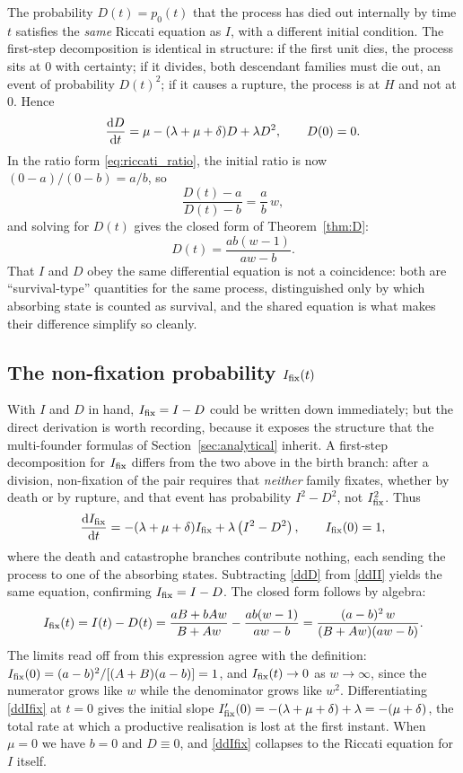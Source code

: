The probability $D(t)=p_0(t)$ that the process has died out internally by time
$t$ satisfies the \textit{same} Riccati equation as $I$, with a different
initial condition. The first-step decomposition is identical in structure: if
the first unit dies, the process sits at $0$ with certainty; if it divides,
both descendant families must die out, an event of probability $D(t)^2$; if it
causes a rupture, the process is at $H$ and not at $0$. Hence
\begin{equation}
\label{ddD}
\displaystyle\frac{{\rm d} D}{{\rm d} t} = \mu - (\lambda + \mu + \delta) D + \lambda D^2,\qquad D(0)=0.
\end{equation}
In the ratio form \eqref{eq:riccati_ratio}, the initial ratio is now
$(0-a)/(0-b)=a/b$, so
$$\frac{D(t)-a}{D(t)-b} = \frac{a}{b}\,w,$$
and solving for $D(t)$ gives the closed form of Theorem~\ref{thm:D}:
$$D(t) = \frac{ab(w-1)}{aw-b}.$$
That $I$ and $D$ obey the same differential equation is not a coincidence: both
are ``survival-type'' quantities for the same process, distinguished only by
which absorbing state is counted as survival, and the shared equation is what
makes their difference simplify so cleanly.

\subsection{The non-fixation probability $I_{\mathrm{fix}}(t)$}

With $I$ and $D$ in hand, $I_{\mathrm{fix}}=I-D$ could be written down immediately; but the
direct derivation is worth recording, because it exposes the structure that the
multi-founder formulas of Section~\ref{sec:analytical} inherit. A first-step
decomposition for $I_{\mathrm{fix}}$ differs from the two above in the birth branch: after
a division, non-fixation of the pair requires that \textit{neither} family
fixates, whether by death or by rupture, and that event has probability
$I^2-D^2$, not $I_{\mathrm{fix}}^2$. Thus
\begin{equation}
\label{ddIfix}
\displaystyle\frac{{\rm d} I_{\mathrm{fix}}}{{\rm d} t} = -(\lambda + \mu + \delta)I_{\mathrm{fix}} + \lambda\left( I^2 - D^2\right),\qquad I_{\mathrm{fix}}(0)=1,
\end{equation}
where the death and catastrophe branches contribute nothing, each sending the
process to one of the absorbing states. Subtracting \eqref{ddD} from
\eqref{ddII} yields the same equation, confirming $I_{\mathrm{fix}} = I - D$. The closed
form follows by algebra:
$$I_{\mathrm{fix}}(t) = I(t) - D(t) = \frac{aB + bAw}{B+Aw} - \frac{ab(w-1)}{aw-b} = \frac{(a-b)^2\,w}{(B+Aw)(aw-b)}.$$
The limits read off from this expression agree with the definition:
$I_{\mathrm{fix}}(0)=(a-b)^2/[(A+B)(a-b)]=1$, and $I_{\mathrm{fix}}(t)\to0$ as $w\to\infty$, since
the numerator grows like $w$ while the denominator grows like $w^2$.
Differentiating \eqref{ddIfix} at $t=0$ gives the initial slope
$I_{\mathrm{fix}}'(0)=-(\lambda+\mu+\delta)+\lambda=-(\mu+\delta)$, the total rate at
which a productive realisation is lost at the first instant. When $\mu=0$ we
have $b=0$ and $D\equiv0$, and \eqref{ddIfix} collapses to the Riccati
equation for $I$ itself.

